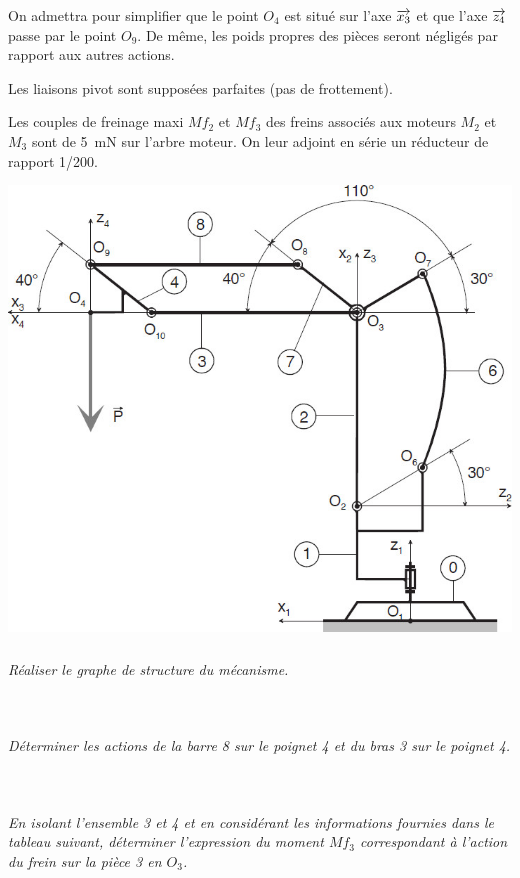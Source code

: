 \documentclass[10pt,fleqn]{article} %
\begin{document}
\begin{multicols}{2}
On admettra pour simplifier que le point $O_4$ est situé sur l’axe  $\overrightarrow{x_3}$ et que l’axe $\overrightarrow{z_4}$ passe par le 
point  $O_9$.  De  même,  les  poids  propres  des  pièces  seront  négligés  par  rapport  aux  autres 
actions. 

Les liaisons pivot sont supposées parfaites (pas de frottement). 

Les  couples de  freinage maxi $Mf_2$ et $Mf_3$ des  freins  associés  aux moteurs $M_2$ et $M_3$ sont de 
\SI{5}{mN} sur l’arbre moteur. On leur adjoint en série un réducteur de rapport 1/200. 

\begin{center}
\includegraphics[width=\linewidth]{images/fig_02}
\end{center}


\subparagraph{}\textit{Réaliser le graphe de structure du mécanisme.}
\ifprof
\begin{corrige}~\\

\end{corrige}
\else
\fi


\subparagraph{}\textit{Déterminer les actions de la barre 8 sur le poignet 4 et du bras 3 sur le poignet 4.}
\ifprof
\begin{corrige}~\\

\end{corrige}
\else
\fi

\subparagraph{}\textit{En isolant l’ensemble 3 et 4 et en considérant les informations fournies dans le tableau suivant, déterminer l’expression du moment $Mf_3$ correspondant à l’action
du frein sur la pièce 3 en $O_3$. }
\ifprof
\begin{corrige}~\\


\end{corrige}
\end{multicols}
\end{document}
